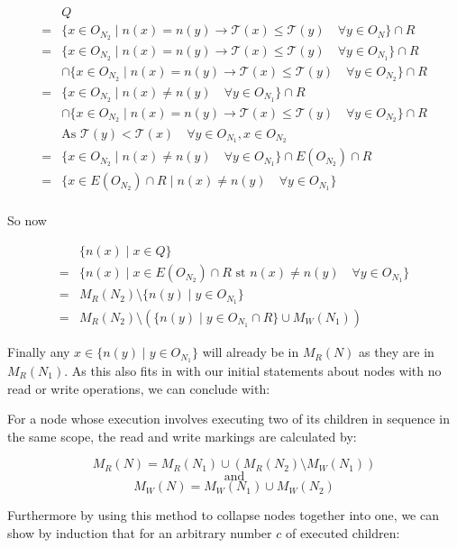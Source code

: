 \documentclass{report}
\begin{document}
\begin{align*}
& Q \\
=& \{x \in O_{N_2} \mid n(x) = n(y) \rightarrow \mathcal{T}(x) \le \mathcal{T}(y) \quad \forall y \in O_N \} \cap R \\
=& \{x \in O_{N_2} \mid n(x) = n(y) \rightarrow \mathcal{T}(x) \le \mathcal{T}(y) \quad \forall y \in O_{N_1} \} \cap R \\
& \cap \{x \in O_{N_2} \mid n(x) = n(y) \rightarrow \mathcal{T}(x) \le \mathcal{T}(y) \quad \forall y \in O_{N_2} \} \cap R \\
=& \{x \in O_{N_2} \mid n(x) \ne n(y) \quad \forall y \in O_{N_1} \} \cap R \\
& \cap \{x \in O_{N_2} \mid n(x) = n(y) \rightarrow \mathcal{T}(x) \le \mathcal{T}(y) \quad \forall y \in O_{N_2} \} \cap R \\
& \text{As } \mathcal{T}(y) < \mathcal{T}(x) \quad \forall y \in O_{N_1}, x \in O_{N_2} \\
=& \{x \in O_{N_2} \mid n(x) \ne n(y) \quad \forall y \in O_{N_1} \} \cap E(O_{N_2}) \cap R \\
=& \{x \in E(O_{N_2}) \cap R \mid n(x) \ne n(y) \quad \forall y \in O_{N_1} \} \\
\end{align*}

So now

\begin{align*}
& \{ n(x) \mid x \in Q \} \\
=& \{ n(x) \mid x \in E(O_{N_2}) \cap R \text{ st } n(x) \ne n(y) \quad \forall y \in O_{N_1} \} \\
=& M_R(N_2) \setminus \{ n(y) \mid y \in O_{N_1} \} \\
=& M_R(N_2) \setminus (\{ n(y) \mid y \in O_{N_1} \cap R \} \cup M_W(N_1)) 
\end{align*}

Finally any $x \in \{ n(y) \mid y \in O_{N_1} \}$ will already be in $M_R(N)$ as they are in $M_R(N_1)$. As this also fits in with
our initial statements about nodes with no read or write operations, we can conclude with:

For a node whose execution involves executing two of its children in sequence in the same scope, the read and write markings are calculated by:

$$M_R(N) = M_R(N_1) \cup (M_R(N_2) \setminus M_W(N_1))$$
$$\text{and}$$
$$M_W(N) = M_W(N_1) \cup M_W(N_2)$$

Furthermore by using this method to collapse nodes together into one, we can show by induction that for an arbitrary number $c$ of executed children:
\end{document}
